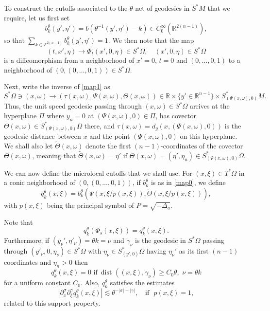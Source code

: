 \documentclass[10pt]{amsart}
\renewcommand{\Pi}{\varPi}
\newcommand{\1}{{\bf 1}}
\newcommand{\R}{{\mathbb R}}
\begin{document}
To construct the cutoffs associated to the $\theta$-net of geodesics in $S^*M$ that we require, let us first
set
\begin{equation}\label{map0}
b^\theta_k(y',\eta')=b(\theta^{-1}(y',\eta')-k)\in C^\infty_0({\mathbb R}^{2(n-1)}),
\end{equation}
so that $\sum_{k\in {\mathbb Z}^{2(n-1)}} b^\theta_k(y',\eta')=1$.  We then note that the map
\begin{equation}\label{map1}
(t,x',\eta)\to \Phi_t(x',0,\eta)\in S^*\Omega, \quad (x',0,\eta)\in S^*\Omega
\end{equation}
is a diffeomorphism from a neighborhood of $x'=0$, $t=0$ and $(0,\dots,0,1)$ to a neighborhood of $(0,(0,\dots,0,1))\in S^*\Omega$.  

Next, write the inverse of \eqref{map1} as
$$S^*\Omega \ni (x,\omega)\to (\tau(x,\omega),\Psi(x,\omega), \Theta(x,\omega))\in \R \times \{y'\in \R^{n-1}\}\times S^*_{(\Psi(x,\omega),0)}M.$$
Thus, the unit speed geodesic passing through $(x,\omega)\in S^*\Omega$ arrives at the hyperplane  $\Pi$ where $y_n=0$ at $(\Psi(x,\omega),0)\in \Pi$,
has covector $\Theta(x,\omega)\in S^*_{(\Psi(x,\omega),0)}\Omega$ there, and $\tau(x,\omega)=d_g(x,(\Psi(x,\omega),0))$ is the geodesic distance
between $x$ and the point $(\Psi(x,\omega),0)$ on this hyperplane.  We shall also let $\tilde \Theta(x,\omega)$ denote the first $(n-1)$-coordinates
of the covector $\Theta(x,\omega)$, meaning that $\tilde\Theta(x,\omega)=\eta'$ if $\Theta(x,\omega)=(\eta',\eta_n)\in S^*_{(\Psi(x,\omega),0)}\Omega$.

We can now define the microlocal cutoffs that we shall use.  For $(x,\xi)\in T^*\Omega$ in a conic neighborhood of $(0,(0,\dots,0,1))$, if
$b^\theta_k$ is as in \eqref{map0}, we define
\begin{equation}\label{b.45}
q^\theta_k(x,\xi)=b^\theta_k(\Psi(x,\xi/p(x,\xi)), \tilde \Theta(x,\xi/p(x,\xi))),
\end{equation}
with $p(x,\xi)$ being the principal symbol of $P=\sqrt{-\Delta_g}$.

Note that
\begin{equation}\label{b.46}
q^\theta_k(\Phi_s(x,\xi))=q^\theta_k(x,\xi).
\end{equation}
Furthermore, 
 if $(y_\nu',\eta'_\nu)=\theta k=\nu$ and $\gamma_\nu$ is the geodesic
in $S^*\Omega$ passing through $(y'_\nu,0,\eta_\nu)\in S^*\Omega$ with 
$\eta_\nu\in S^*_{(y',0)}\Omega$ having $\eta_\nu'$ as its first $(n-1)$ coordinates
and $\eta_n>0$ then
\begin{equation}\label{b.48}
q^\theta_k(x,\xi)=0 \, \, 
\text{if } \, \text{dist }((x,\xi),\gamma_\nu)\ge C_0\theta, \, \, \nu=\theta k
\end{equation}
for a uniform constant $C_0$.  Also, $q_k^\theta$ satisfies the estimates
\begin{equation}\label{b.49}
|\partial_x^\sigma \partial_\xi^\gamma q^\theta_k(x,\xi)|\lesssim \theta^{-|\sigma|-|\gamma|},
\quad \text{if } \, \, p(x,\xi)=1,
\end{equation}
related to this support property.
\end{document}
